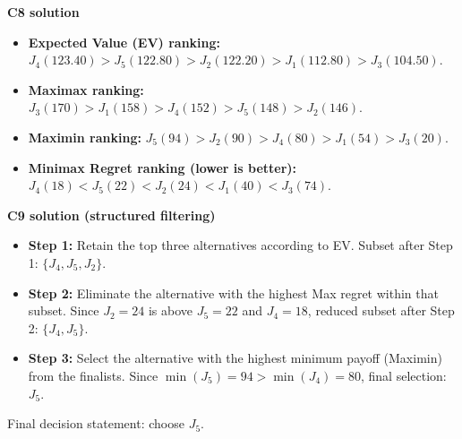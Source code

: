 \begin{ExamProblems}
		\textbf{C8 solution}
		\begin{itemize}
			\item \textbf{Expected Value (EV) ranking:} $J_4(123.40)>J_5(122.80)>J_2(122.20)>J_1(112.80)>J_3(104.50)$.
			\item \textbf{Maximax ranking:} $J_3(170)>J_1(158)>J_4(152)>J_5(148)>J_2(146)$.
			\item \textbf{Maximin ranking:} $J_5(94)>J_2(90)>J_4(80)>J_1(54)>J_3(20)$.
			\item \textbf{Minimax Regret ranking (lower is better):} $J_4(18)<J_5(22)<J_2(24)<J_1(40)<J_3(74)$.
		\end{itemize}

		\textbf{C9 solution (structured filtering)}
		\begin{itemize}
			\item \textbf{Step 1:} Retain the top three alternatives according to EV. Subset after Step 1: $\{J_4,J_5,J_2\}$.
			\item \textbf{Step 2:} Eliminate the alternative with the highest Max regret within that subset. Since $J_2=24$ is above $J_5=22$ and $J_4=18$, reduced subset after Step 2: $\{J_4,J_5\}$.
			\item \textbf{Step 3:} Select the alternative with the highest minimum payoff (Maximin) from the finalists. Since $\min(J_5)=94>\min(J_4)=80$, final selection: $J_5$.
		\end{itemize}
		Final decision statement: choose $J_5$.
	\end{ExamProblems}

